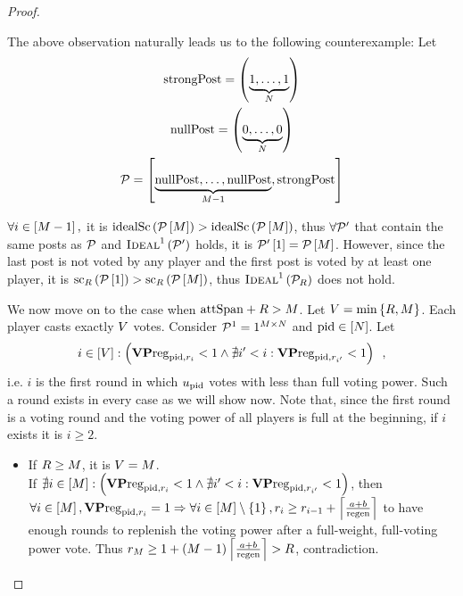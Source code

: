 \begin{proof}
\begin{itemize}
    The above observation naturally leads us to the following counterexample:
    Let
    \begin{gather*}
      \strongpost = \left(\underbrace{1, \dots, 1}_{\playerlen}\right) \\
      \nullpost = \left(\underbrace{0, \dots, 0}_{\playerlen}\right) \\
      \postlist = \left[\underbrace{\nullpost, \dots, \nullpost}_{\postlen -
      1}, \strongpost\right]
    \end{gather*}

    $\forall i \in \left[\postlen - 1\right],$ it is
    $\idsc{\postlist\left[\postlen\right]} >
    \idsc{\postlist\left[\postlen\right]}$, thus $\forall \postlist'$ that
    contain the same posts as $\postlist$ and
    $\textsc{Ideal}^1\left(\postlist'\right)$ holds, it is
    $\postlist'\left[1\right] = \postlist\left[\postlen\right]$. However,
    since the last post is not voted by any player and the first post is voted
    by at least one player, it is
    $\mathrm{sc}_\rounds\left(\postlist\left[1\right]\right) >
    \mathrm{sc}_\rounds\left(\postlist\left[\postlen\right]\right)$, thus
    $\textsc{Ideal}^1\left(\postlist_\rounds\right)$ does not hold.

    We now move on to the case when $\attspan + \rounds > \postlen$. Let
    $\votenum = \min{\left\{\rounds, \postlen\right\}}$. Each player casts
    exactly $\votenum$ votes. Consider $\postlist^1 = 1^{\postlen \times
    \playerlen}$ and $\pid \in \left[\playerlen\right]$. Let
    \begin{equation*}
      i \in \left[\votenum\right] :\left(\votpowvecreg_{\pid, \round_i} < 1
      \wedge \nexists i' < i: \votpowvecreg_{\pid, \round_{i'}} < 1\right)
      \enspace,
    \end{equation*}
    i.e. $i$ is the first round in which $u_\pid$ votes with less than full
    voting power. Such a round exists in every case as we will show now. Note
    that, since the first round is a voting round and the voting power of all
    players is full at the beginning, if $i$ exists it is $i \geq 2$.

    \begin{itemize}
      \item If $\rounds \geq \postlen$, it is $\votenum = \postlen$. \\
      If $\nexists i \in \left[\postlen\right] :\left(\votpowvecreg_{\pid,
      \round_i} < 1 \wedge \nexists i' < i: \votpowvecreg_{\pid, \round_{i'}} <
      1\right)$, then $\forall i \in \left[\postlen\right], \votpowvecreg_{\pid,
      \round_i} = 1 \Rightarrow \forall i \in \left[\postlen\right] \setminus
      \left\{1\right\}, \round_i \geq \round_{i - 1} + \ceil*{\frac{a +
      b}{\regen}}$ to have enough rounds to replenish the voting power after a
      full-weight, full-voting power vote. Thus $\round_\postlen \geq 1 +
      \left(\postlen - 1\right)\ceil*{\frac{a + b}{\regen}} > \rounds$,
      contradiction.


\end{itemize}
\end{itemize}
\end{proof}
